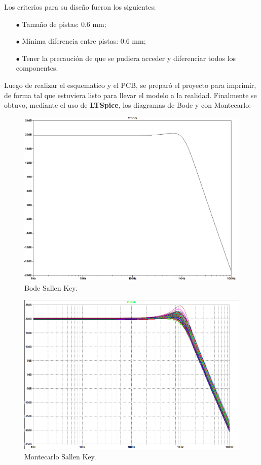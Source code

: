 \documentclass[a4paper]{article}
\begin{document}
Los criterios para su diseño fueron los siguientes:
\begin{itemize}
\item[$\bullet$]Tamaño de pistas: 0.6 mm;
\item[$\bullet$]Mínima diferencia entre pistas: 0.6 mm;
\item[$\bullet$]Tener la precaución de que se pudiera acceder y diferenciar todos los componentes.
\end{itemize} 

Luego de realizar el esquematico y el PCB, se preparó el proyecto para imprimir, de forma tal que estuviera listo para llevar el modelo a la realidad.
Finalmente se obtuvo, mediante el uso de \textbf{LTSpice}, los diagramas de Bode y con Montecarlo:

\begin{figure}[H]
	\centering
	\includegraphics[width=\textwidth]{Altium-BODE}
	\caption{Bode Sallen Key.}
	\label{fig:BodeAltium}
\end{figure}

\begin{figure}[H]
	\centering
	\includegraphics[width=\textwidth]{Altium-MC}
	\caption{Montecarlo Sallen Key.}
	\label{fig:MCAltium}
\end{figure}
\end{document}
